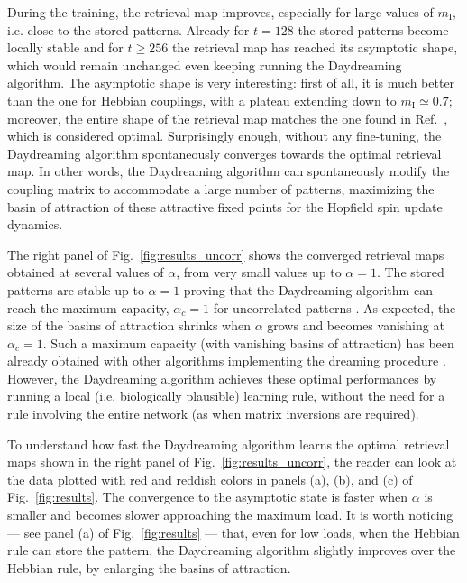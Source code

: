 \documentclass[a4paper]{cas-sc}
\newcommand{\mI}{m_\text{I}}
\begin{document}
During the training, the retrieval map improves, especially for large values of $\mI$, i.e. close to the stored patterns. Already for $t=128$ the stored patterns become locally stable and for $t\ge 256$ the retrieval map has reached its asymptotic shape, which would remain unchanged even keeping running the Daydreaming algorithm. The asymptotic shape is very interesting: first of all, it is much better than the one for Hebbian couplings, with a plateau extending down to $\mI\simeq 0.7$; moreover, the entire shape of the retrieval map matches the one found in Ref.~\cite{benedetti2022supervised}, which is considered optimal.
Surprisingly enough, without any fine-tuning, the Daydreaming algorithm spontaneously converges towards the optimal retrieval map. In other words, the Daydreaming algorithm can spontaneously modify the coupling matrix to accommodate a large number of patterns, maximizing the basin of attraction of these attractive fixed points for the Hopfield spin update dynamics.

The right panel of Fig.~\ref{fig:results_uncorr} shows the converged retrieval maps obtained at several values of $\alpha$, from very small values up to $\alpha=1$.
The stored patterns are stable up to $\alpha=1$ proving that the Daydreaming algorithm can reach the maximum capacity, $\alpha_c=1$ for uncorrelated patterns  \cite{gardner1988space}.
As expected, the size of the basins of attraction shrinks when $\alpha$ grows and becomes vanishing at $\alpha_c=1$.
Such a maximum capacity (with vanishing basins of attraction) has been already obtained with other algorithms implementing the dreaming procedure \cite{fachechi2019dreaming}.
However, the Daydreaming algorithm achieves these optimal performances by running a local (i.e. biologically plausible) learning rule, without the need for a rule involving the entire network (as when matrix inversions are required).

To understand how fast the Daydreaming algorithm learns the optimal retrieval maps shown in the right panel of Fig.~\ref{fig:results_uncorr}, the reader can look at the data plotted with red and reddish colors in panels (a), (b), and (c) of Fig.~\ref{fig:results}.
The convergence to the asymptotic state is faster when $\alpha$ is smaller and becomes slower approaching the maximum load.
It is worth noticing --- see panel (a) of Fig.~\ref{fig:results} --- that, even for low loads, when the Hebbian rule can store the pattern, the Daydreaming algorithm slightly improves over the Hebbian rule, by enlarging the basins of attraction.
\end{document}

